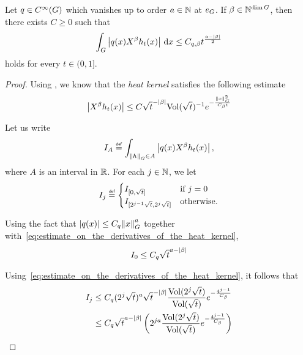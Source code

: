 \begin{lemma}
\label{lemma:estimate_on_heat_kernel}
    Let $q \in \SmoothFunctions \Group$ which vanishes up to order $a \in \N$ at $e_\Group$.
    If $\beta \in \N^{\dim \Group}$,
    then there exists $C \geq 0$ such that
    \begin{align}
        \int_\Group \abs {q(x) \LeftDifferentialOperator \beta h_t(x)} \dd x
        \leq C_{q, \beta} t^{\frac {a - \abs \beta} 2}
    \end{align}
    holds for every $t \in (0, 1]$.
\end{lemma}
\begin{proof}
    Using \cite[Theorem VIII.2.7]{VaropoulosSaloffCosteCoulhon92},
    we know that the \emph{heat kernel} satisfies the following estimate
    \begin{align}
        \abs {\LeftDifferentialOperator \beta h_t(x)} \leq C \sqrt t^{-\abs \beta} \Volume {\sqrt t}^{-1} \e^{-\frac{\norm [\Group] x^2} {C_\beta t}}
        \label{eq:estimate_on_the_derivatives_of_the_heat_kernel}
    \end{align}

    Let us write
    \begin{align*}
        I_A \defeq \int_{\norm [\Group] h \in A} \abs {q(x) \LeftDifferentialOperator \beta h_t(x)},
    \end{align*}
    where $A$ is an interval in $\R$.
    For each $j \in \N$,
    we let
    \begin{align*}
        I_j \defeq
        \begin{cases}
            I_{[0, \sqrt t]} & \text{if } j = 0\\
            I_{[2^{j - 1} \sqrt t, 2^j \sqrt t]} & \text{otherwise}.
        \end{cases}
    \end{align*}

    Using the fact that $\abs {q(x)} \leq C_q \norm [\Group] x^a$
    together with~\eqref{eq:estimate_on_the_derivatives_of_the_heat_kernel},
    \begin{align*}
        I_0 \leq C_q \sqrt t^{a -\abs \beta}
    \end{align*}

    Using~\eqref{eq:estimate_on_the_derivatives_of_the_heat_kernel},
    it follows that
    \begin{align*}
        I_j &\leq C_q (2^j \sqrt t)^a \sqrt t^{-\abs \beta} \frac {\Volume {2^j \sqrt t}} {\Volume {\sqrt t}} \e^{-\frac{4^{j - 1}} {C_\beta}}\\
        &\leq C_q \sqrt t^{a - \abs \beta}
        \left(2^{j a} \frac {\Volume {2^j \sqrt t}} {\Volume {\sqrt t}} \e^{-\frac{4^{j - 1}} {C_\beta}}\right)
    \end{align*}


\end{proof}
